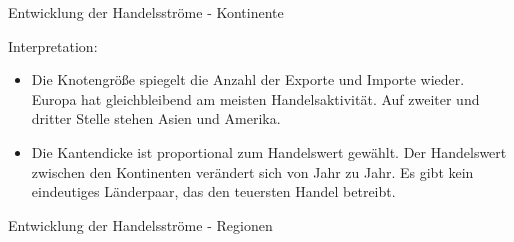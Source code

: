 \documentclass{scrartcl}
\begin{document}

\normalsize

\begin{center}
Entwicklung der Handelsströme - Kontinente
\end{center}

\begin{figure}[!htb]
\centering
{}
\end{figure}
Interpretation:
\begin{itemize}
\item Die Knotengröße spiegelt die Anzahl der Exporte und Importe wieder. Europa hat gleichbleibend am meisten Handelsaktivität. Auf zweiter und dritter Stelle stehen Asien und Amerika.

\item Die Kantendicke ist proportional zum Handelswert gewählt. Der Handelswert zwischen den Kontinenten verändert sich von Jahr zu Jahr. Es gibt kein eindeutiges Länderpaar, das den teuersten Handel betreibt.
\end{itemize}


\pagebreak

\begin{center}
Entwicklung der Handelsströme - Regionen
\end{center}

\begin{figure}[!htb]
\centering
{}
\end{figure}
\end{document}
